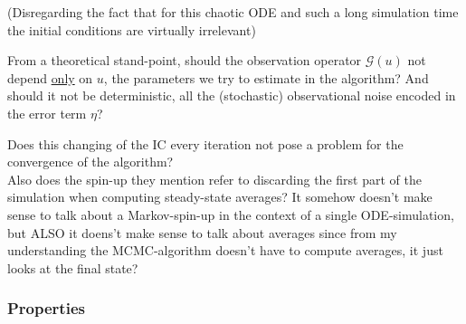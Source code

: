 \documentclass[11pt]{article}
\newcommand{\G}[1]{{\mathcal{G} \left( #1 \right)}}
\begin{document}
(Disregarding the fact that for this chaotic ODE and such a long simulation time the initial
conditions are virtually irrelevant)

From a theoretical stand-point, should the observation operator \(\G{u}\) not depend \uline{only} on
\(u\), the parameters we try to estimate in the algorithm? And should it not be deterministic,
all the (stochastic) observational noise encoded in the error term \(\eta\)?

Does this changing of the IC every iteration not pose a problem for the convergence of the
algorithm?\\

Also does the spin-up they mention refer to discarding the first part of the simulation
when computing steady-state averages? It somehow doesn't make sense to talk about a
Markov-spin-up in the context of a single ODE-simulation, but ALSO it doens't make sense
to talk about averages since from my understanding the MCMC-algorithm doesn't have to
compute averages, it just looks at the final state?


\subsubsection{Properties}
\label{sec:org9bd91e9}
\end{document}
